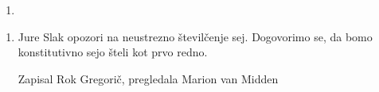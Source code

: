 \documentclass[12pt]{article}
\theoremstyle{definition}
\begin{document}
\begin{enumerate}[label =\textbf{Ad. \arabic*.}]
\addtocounter{enumi}{1}
\item  {} 

\end{enumerate}
\begin{enumerate}[label =\textbf{Ad. \arabic*.}]
\addtocounter{enumi}{2}


\item Jure Slak opozori na neustrezno \v{s}tevil\v{c}enje sej. Dogovorimo se, da bomo konstitutivno sejo \v{s}teli kot prvo redno. 


\setlength{\parskip}{9pt}

\noindent Zapisal Rok Gregori\v{c}, pregledala Marion van Midden\\

\end{enumerate}
\end{document}
